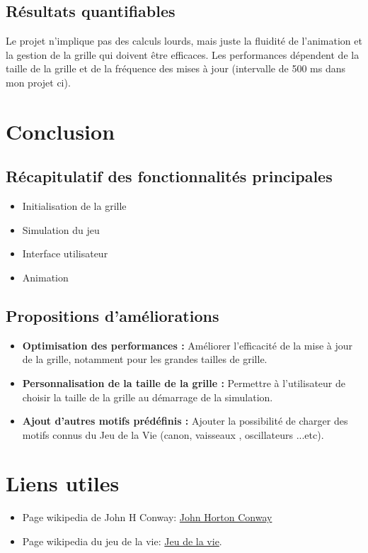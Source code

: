 \documentclass[a4paper,12pt]{article}
\begin{document}
    \subsection{Résultats quantifiables}
    Le projet n'implique pas des calculs lourds, mais juste la fluidité de l'animation et la gestion de la grille qui doivent être efficaces. Les performances dépendent de la taille de la grille et de la fréquence des mises à jour (intervalle de 500 ms dans mon projet ci).\\
    \section{Conclusion}
    \subsection{Récapitulatif des fonctionnalités principales}
    \begin{itemize}
        \item Initialisation de la grille \\
        \item Simulation du jeu \\
        \item Interface utilisateur \\
        \item Animation 
    \end{itemize}
    \subsection{Propositions d’améliorations}
    \begin{itemize}
        \item \textbf{Optimisation des performances :} Améliorer l'efficacité de la mise à jour de la grille, notamment pour les grandes tailles de grille. \\
          \item \textbf{Personnalisation de la taille de la grille :} Permettre à l'utilisateur de choisir la taille de la grille au démarrage de la simulation. \\
            \item \textbf{Ajout d'autres motifs prédéfinis :} Ajouter la possibilité de charger des motifs connus du Jeu de la Vie (canon, vaisseaux , oscillateurs ...etc).
    \end{itemize}
    \section{Liens utiles}
    \begin{itemize}
      \item Page wikipedia de John H Conway: \href{https://fr.wikipedia.org/wiki/John_Horton_Conway}{John Horton Conway}\\
    \item  Page wikipedia du jeu de la vie: \href{https://fr.wikipedia.org/wiki/Jeu_de_la_vie}{Jeu de la vie}.
     \end{itemize}
\end{document}
